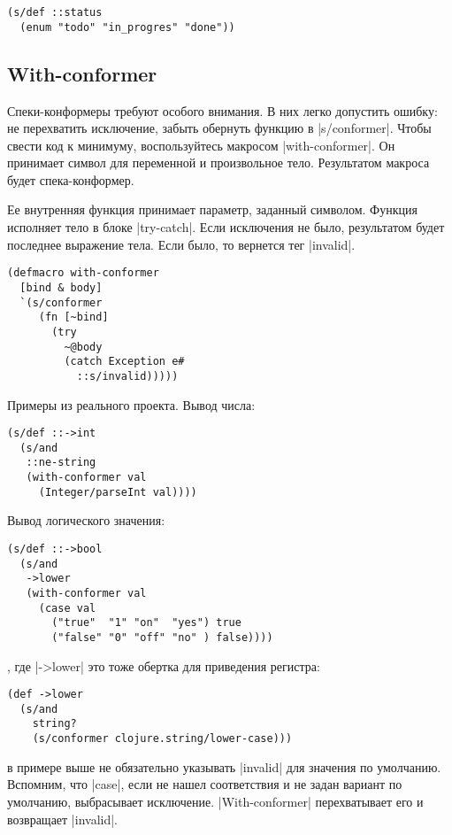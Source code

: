 \begin{verbatim}
(s/def ::status
  (enum "todo" "in_progres" "done"))
\end{verbatim}

\subsection{With-conformer}

Спеки-конформеры требуют особого внимания. В них легко допустить ошибку: не
перехватить исключение, забыть обернуть функцию в \spverb|s/conformer|. Чтобы свести
код к минимуму, воспользуйтесь макросом \spverb|with-conformer|. Он принимает символ
для переменной и произвольное тело. Результатом макроса будет спека-конформер.

Ее внутренняя функция принимает параметр, заданный символом. Функция исполняет
тело в блоке \spverb|try-catch|. Если исключения не было, результатом будет последнее
выражение тела. Если было, то вернется тег \spverb|invalid|.

\begin{verbatim}
(defmacro with-conformer
  [bind & body]
  `(s/conformer
     (fn [~bind]
       (try
         ~@body
         (catch Exception e#
           ::s/invalid)))))
\end{verbatim}

Примеры из реального проекта. Вывод числа:

\begin{verbatim}
(s/def ::->int
  (s/and
   ::ne-string
   (with-conformer val
     (Integer/parseInt val))))
\end{verbatim}

Вывод логического значения:

\begin{verbatim}
(s/def ::->bool
  (s/and
   ->lower
   (with-conformer val
     (case val
       ("true"  "1" "on"  "yes") true
       ("false" "0" "off" "no" ) false))))
\end{verbatim}

, где \spverb|->lower| это тоже обертка для приведения регистра:

\begin{verbatim}
(def ->lower
  (s/and
    string?
    (s/conformer clojure.string/lower-case)))
\end{verbatim}

в примере выше не обязательно указывать \spverb|invalid| для значения по
умолчанию. Вспомним, что \spverb|case|, если не нашел соответствия и не задан вариант
по умолчанию, выбрасывает исключение. \spverb|With-conformer| перехватывает его и
возвращает \spverb|invalid|.

